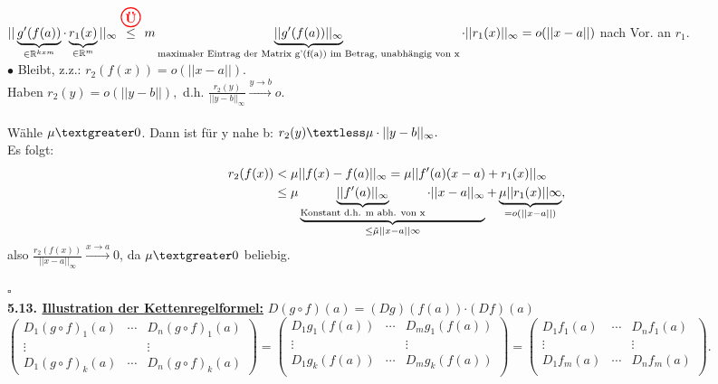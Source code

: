\documentclass[]{scrartcl}
\newcommand{\redcircle}[1]{%
	\tikz[baseline=(char.base)]{
		\node[shape=circle, draw=red, text=red, thick, inner sep=1pt] (char) 
		{\textbf{#1}};
	}%
}
\begin{document}
	$||\underbrace{g'(f(a))}_{\in\mathbb{R}^{k x m}}\cdot 
	\underbrace{r_1(x)}_{\in \mathbb{R}^m}||_\infty 
	\overset{\redcircle{Ü}}{\leq}
	m\underbrace{||g'(f(a))||_\infty}_{\text{maximaler Eintrag der Matrix 
	g'(f(a)) im Betrag, unabhängig von x}}\cdot ||r_1(x)||_\infty=o(||x-a||)$ 
	nach Vor. an $r_1$.\\
	$\bullet$ Bleibt, z.z.: $r_2(f(x))=o(||x-a||).$\\
	Haben $r_2(y)=o(||y-b||),$ d.h. 
	$\frac{r_2(y)}{||y-b||_\infty}\xrightarrow{y\rightarrow b}o.$\\
	\\
	Wähle $\mu \textgreater 0$. Dann ist für y nahe b: $r_2(y)\textless 
	\mu\cdot||y-b||_\infty.$\\
	Es folgt: \begin{align}
		r_2(f(x))&\textless 
		\mu||f(x)-f(a)||_\infty=\mu||f'(a)(x-a)+r_1(x)||_\infty\\
		&\leq\mu \underbrace{\underbrace{||f'(a)||_\infty}_{\text{Konstant d.h. 
		m abh. von x}}\cdot||x-a||_\infty}_{\leq 
		\tilde{\mu}||x-a||\infty}+\underbrace{\mu||r_1(x)||\infty}_{=o(||x-a||)},
	\end{align}
	also $\frac{r_2 (f(x))}{||x-a||_\infty}\xrightarrow{x\rightarrow a}0$, da 
	$\mu \textgreater 0$ beliebig.\\
	\strut\hfill$\square$\\
	\textbf{5.13. \underline{Illustration der Kettenregelformel:}} $D(g\circ 
	f)(a)=$\ul{$(Dg)(f(a))$}$\cdot$\ul{$(Df)(a)$}\\
	$\begin{pmatrix}
		D_1(g\circ f)_1(a)&\cdots&D_n(g\circ f)_1(a)\\
		\vdots& &\vdots\\
		D_1(g\circ f)_k(a)&\cdots&D_n(g\circ f)_k(a)
	\end{pmatrix}=\begin{pmatrix}
	D_1g_1(f(a))&\cdots&D_mg_1(f(a))\\
	\vdots& &\vdots\\
	D_1g_k(f(a))&\cdots&D_mg_k(f(a))\\
	\end{pmatrix}=\begin{pmatrix}
		D_1f_1(a)&\cdots&D_nf_1(a)\\
		\vdots& &\vdots\\
		D_1f_m(a)&\cdots&D_nf_m(a)\\
	\end{pmatrix}.$\\
\end{document}
